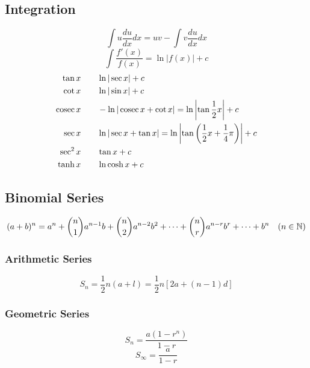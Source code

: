         \subsection{Integration}
        \begin{equation}
            \int u\frac{du}{dx}dx=uv-\int v\frac{du}{dx}dx
        \end{equation}
        \begin{equation}
            \int \frac{f'(x)}{f(x)}=\ln|f(x)|+c
        \end{equation}
        \begin{align}
            \tan x&\qquad\ln|\sec x|+c \\
            \cot x&\qquad\ln|\sin x|+c \\
            \operatorname{cosec} x&\qquad-\ln|\operatorname{cosec} x+\cot x|=\ln\left|\tan \frac{1}{2}x\right|+c \\
            \sec x&\qquad\ln|\sec x+\tan x|=\ln\left|\tan\left(\frac{1}{2}x+\frac{1}{4}\pi\right)\right|+c \\
            \sec^2x&\qquad\tan x+c \\
            \tanh x&\qquad\ln\cosh x+c
        \end{align}

    \subsection{Binomial Series}
        \begin{equation}
            (a+b)^n=a^n+\binom{n}{1}a^{n-1}b+\binom{n}{2}a^{n-2}b^2+\cdots+\binom{n}{r}a^{n-r}b^r+\cdots+b^n\quad(n\in\operatorname{\mathbb{N}})
        \end{equation}

        \subsubsection{Arithmetic Series}
        \begin{equation} \label{eq:arithmetic_series_finite_sum}
            S_n=\frac{1}{2}n(a+l)=\frac{1}{2}n[2a+(n-1)d]
        \end{equation}

        \subsubsection{Geometric Series}
        \begin{equation} \label{eq:geometric_series_finite_sum}
            S_n=\frac{a(1-r^n)}{1-r}
        \end{equation}
        \begin{equation} \label{eq:geometric_series_infinite_sum}
            S_\infty=\frac{a}{1-r}
        \end{equation}

